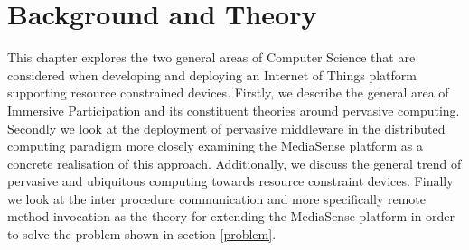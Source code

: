 \chapter{Background and Theory}
This chapter explores the two general areas of Computer Science that are considered when developing and deploying an Internet of Things platform supporting resource constrained devices. Firstly, we describe the general area of Immersive Participation and its constituent theories around pervasive computing. Secondly we look at the deployment of pervasive middleware in the distributed computing paradigm more closely examining the MediaSense platform as a concrete realisation of this approach. Additionally, we discuss the general trend of pervasive and ubiquitous computing towards resource constraint devices. Finally we look at the inter procedure communication and more specifically remote method invocation as the theory for extending the MediaSense platform in order to solve the problem shown in section \ref{problem}. 








